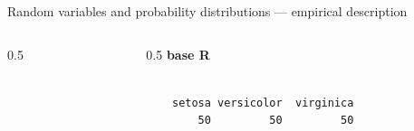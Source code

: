 \documentclass[
  ignorenonframetext,
  aspectratio=169,
  t]{beamer}
\newenvironment{Shaded}{\begin{snugshade}}{\end{snugshade}}
\newcommand{\FunctionTok}[1]{\textcolor[rgb]{0.28,0.35,0.67}{#1}}
\newcommand{\NormalTok}[1]{\textcolor[rgb]{0.00,0.23,0.31}{#1}}
\newcommand{\SpecialCharTok}[1]{\textcolor[rgb]{0.37,0.37,0.37}{#1}}
\newcommand{\bluebold}[1]{\textcolor{bluebeamer}{\textbf{#1}}}
\begin{document}
\begin{frame}[fragile]{Random variables and probability distributions
--- empirical description}
\begin{columns}[T]
\begin{column}{0.5\linewidth}
\normalsize
\end{column}

\begin{column}{0.5\linewidth}
\centering\bluebold{base R}

\footnotesize

\begin{Shaded}
\end{Shaded}

\begin{verbatim}

    setosa versicolor  virginica 
        50         50         50 
\end{verbatim}

\normalsize
\end{column}
\end{columns}
\end{frame}
\end{document}
